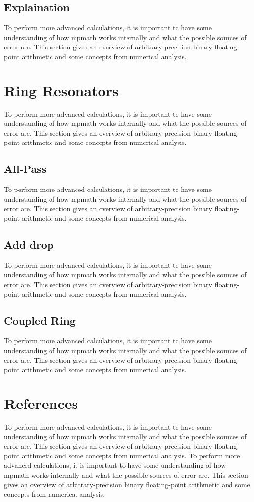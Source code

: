 \subsection{Explaination}
To perform more advanced calculations, it is important to have some understanding of how mpmath works internally and what the possible sources of error are. This section gives an overview of arbitrary-precision binary floating-point arithmetic and some concepts from numerical analysis.

\section{Ring Resonators}
To perform more advanced calculations, it is important to have some understanding of how mpmath works internally and what the possible sources of error are. This section gives an overview of arbitrary-precision binary floating-point arithmetic and some concepts from numerical analysis.
\subsection{All-Pass}
To perform more advanced calculations, it is important to have some understanding of how mpmath works internally and what the possible sources of error are. This section gives an overview of arbitrary-precision binary floating-point arithmetic and some concepts from numerical analysis.
\subsection{Add drop}
To perform more advanced calculations, it is important to have some understanding of how mpmath works internally and what the possible sources of error are. This section gives an overview of arbitrary-precision binary floating-point arithmetic and some concepts from numerical analysis.
\subsection{Coupled Ring}
To perform more advanced calculations, it is important to have some understanding of how mpmath works internally and what the possible sources of error are. This section gives an overview of arbitrary-precision binary floating-point arithmetic and some concepts from numerical analysis.


\section*{References}

To perform more advanced calculations, it is important to have some understanding of how mpmath works internally and what the possible sources of error are. This section gives an overview of arbitrary-precision binary floating-point arithmetic and some concepts from numerical analysis.
To perform more advanced calculations, it is important to have some understanding of how mpmath works internally and what the possible sources of error are. This section gives an overview of arbitrary-precision binary floating-point arithmetic and some concepts from numerical analysis.
